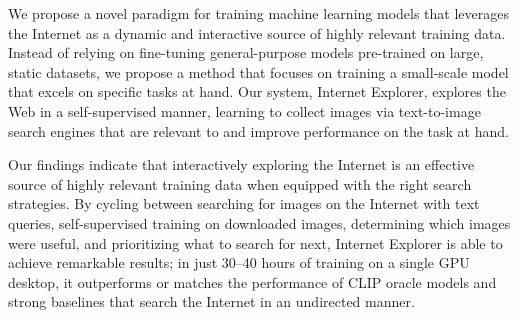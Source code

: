 

We propose a novel paradigm for training machine learning models that leverages the Internet as a dynamic and interactive source of highly relevant training data. Instead of relying on fine-tuning general-purpose models pre-trained on large, static datasets, we propose a method that focuses on training a small-scale model that excels on specific tasks at hand. Our system, Internet Explorer, explores the Web in a self-supervised manner, learning to collect images via text-to-image search engines that are relevant to and improve performance on the task at hand.

Our findings indicate that interactively exploring the Internet is an effective source of highly relevant training data when equipped with the right search strategies.
By cycling between searching for images on the Internet with text queries, self-supervised training on downloaded images, determining which images were useful, and prioritizing what to search for next, Internet Explorer is able to achieve remarkable results; in just 30--40 hours of training on a single GPU desktop, it outperforms or matches the performance of CLIP oracle models and strong baselines that search the Internet in an undirected manner.

